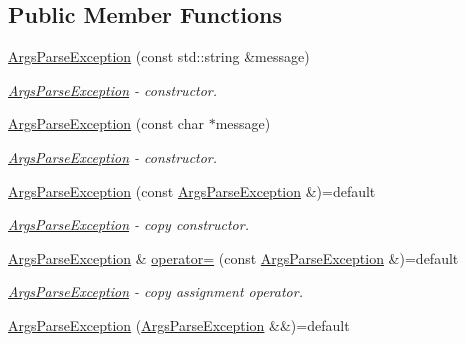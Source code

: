 \subsection*{Public Member Functions}
\begin{DoxyCompactItemize}
\item 
\hyperlink{classmin__path_1_1argument__parser_1_1_args_parse_exception_a3d4b6c6bbd11120adce24e7f568db6ef}{Args\+Parse\+Exception} (const std\+::string \&message)
\begin{DoxyCompactList}\small\item\em \hyperlink{classmin__path_1_1argument__parser_1_1_args_parse_exception}{Args\+Parse\+Exception} -\/ constructor. \end{DoxyCompactList}\item 
\hyperlink{classmin__path_1_1argument__parser_1_1_args_parse_exception_ac390957b5d1f525ebb0bad34d46e912c}{Args\+Parse\+Exception} (const char $\ast$message)
\begin{DoxyCompactList}\small\item\em \hyperlink{classmin__path_1_1argument__parser_1_1_args_parse_exception}{Args\+Parse\+Exception} -\/ constructor. \end{DoxyCompactList}\item 
\hyperlink{classmin__path_1_1argument__parser_1_1_args_parse_exception_afe95d99b83df0d490a4804be85e93f64}{Args\+Parse\+Exception} (const \hyperlink{classmin__path_1_1argument__parser_1_1_args_parse_exception}{Args\+Parse\+Exception} \&)=default
\begin{DoxyCompactList}\small\item\em \hyperlink{classmin__path_1_1argument__parser_1_1_args_parse_exception}{Args\+Parse\+Exception} -\/ copy constructor. \end{DoxyCompactList}\item 
\hyperlink{classmin__path_1_1argument__parser_1_1_args_parse_exception}{Args\+Parse\+Exception} \& \hyperlink{classmin__path_1_1argument__parser_1_1_args_parse_exception_acd3650bb1fa2d905628fe9221f51af91}{operator=} (const \hyperlink{classmin__path_1_1argument__parser_1_1_args_parse_exception}{Args\+Parse\+Exception} \&)=default
\begin{DoxyCompactList}\small\item\em \hyperlink{classmin__path_1_1argument__parser_1_1_args_parse_exception}{Args\+Parse\+Exception} -\/ copy assignment operator. \end{DoxyCompactList}\item 
\hyperlink{classmin__path_1_1argument__parser_1_1_args_parse_exception_a8f4184349561f76761c2a19ab5ffe3eb}{Args\+Parse\+Exception} (\hyperlink{classmin__path_1_1argument__parser_1_1_args_parse_exception}{Args\+Parse\+Exception} \&\&)=default

\end{DoxyCompactItemize}
